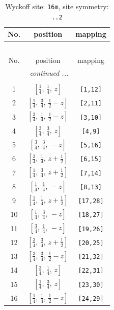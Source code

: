 \documentclass[fleqn,8pt]{jsarticle}
\begin{document}
\begin{longtable}{ccc}
\caption{Wyckoff site: {\tt 16m}, site symmetry: {\tt ..2}}
 \\
 \hline \hline
No. & position & mapping \\ \hline \endfirsthead

\multicolumn{2}{l}{\tablename\ \thetable{}} \\
 \hline \hline
No. & position & mapping \\ \hline \endhead

 \hline \hline
\multicolumn{2}{r}{\footnotesize\it continued ...} \\ \endfoot

 \hline \hline
\multicolumn{2}{r}{} \\ \endlastfoot

1 & $\left[ \frac{1}{4},\, \frac{1}{4},\, z \right]$ & {\tt [1,12]} \\ \hline
2 & $\left[ \frac{1}{4},\, \frac{3}{4},\, \frac{1}{2} - z \right]$ & {\tt [2,11]} \\ \hline
3 & $\left[ \frac{3}{4},\, \frac{1}{4},\, \frac{1}{2} - z \right]$ & {\tt [3,10]} \\ \hline
4 & $\left[ \frac{3}{4},\, \frac{3}{4},\, z \right]$ & {\tt [4,9]} \\ \hline
5 & $\left[ \frac{3}{4},\, \frac{3}{4},\, - z \right]$ & {\tt [5,16]} \\ \hline
6 & $\left[ \frac{3}{4},\, \frac{1}{4},\, z + \frac{1}{2} \right]$ & {\tt [6,15]} \\ \hline
7 & $\left[ \frac{1}{4},\, \frac{3}{4},\, z + \frac{1}{2} \right]$ & {\tt [7,14]} \\ \hline
8 & $\left[ \frac{1}{4},\, \frac{1}{4},\, - z \right]$ & {\tt [8,13]} \\ \hline
9 & $\left[ \frac{1}{4},\, \frac{1}{4},\, z + \frac{1}{2} \right]$ & {\tt [17,28]} \\ \hline
10 & $\left[ \frac{1}{4},\, \frac{3}{4},\, - z \right]$ & {\tt [18,27]} \\ \hline
11 & $\left[ \frac{3}{4},\, \frac{1}{4},\, - z \right]$ & {\tt [19,26]} \\ \hline
12 & $\left[ \frac{3}{4},\, \frac{3}{4},\, z + \frac{1}{2} \right]$ & {\tt [20,25]} \\ \hline
13 & $\left[ \frac{3}{4},\, \frac{3}{4},\, \frac{1}{2} - z \right]$ & {\tt [21,32]} \\ \hline
14 & $\left[ \frac{3}{4},\, \frac{1}{4},\, z \right]$ & {\tt [22,31]} \\ \hline
15 & $\left[ \frac{1}{4},\, \frac{3}{4},\, z \right]$ & {\tt [23,30]} \\ \hline
16 & $\left[ \frac{1}{4},\, \frac{1}{4},\, \frac{1}{2} - z \right]$ & {\tt [24,29]} \\
\end{longtable}
\end{document}
